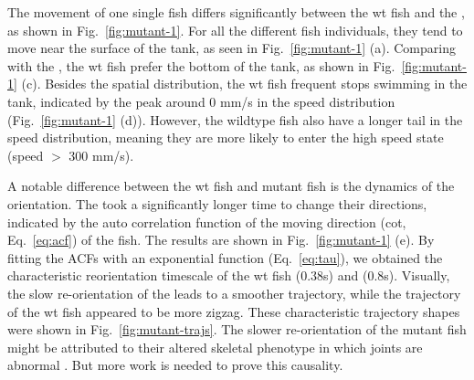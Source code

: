 \documentclass[11pt,twoside]{report}
\begin{document}
The movement of one single fish differs significantly between the wt fish and the {\mf}, as shown in Fig.~\ref{fig:mutant-1}.
For all the different fish individuals, they tend to move near the surface of the tank, as seen in Fig.~\ref{fig:mutant-1} (a).
Comparing with the {\mf}, the wt fish prefer the bottom of the tank, as shown in Fig.~\ref{fig:mutant-1} (c).
Besides the spatial distribution, the wt fish frequent stops swimming in the tank, indicated by the peak around 0 mm/s in the speed distribution (Fig.~\ref{fig:mutant-1} (d)).
However, the wildtype fish also have a longer tail in the speed distribution, meaning they are more likely to enter the high speed state (speed $>$ 300 mm/s).


A notable difference between the wt fish and mutant fish is the dynamics of the orientation.
The {\mf} took a significantly longer time to change their directions, indicated by the auto correlation function of the moving direction (\gls{cot}, Eq.~\ref{eq:acf}) of the fish.
The results are shown in Fig.~\ref{fig:mutant-1} (e).
By fitting the ACFs with an exponential function (Eq.~\ref{eq:tau}), we obtained the characteristic reorientation timescale of the wt fish (0.38s) and {\mf} (0.8s). Visually, the slow re-orientation of the {\mf} leads to a smoother trajectory, while the trajectory of the wt fish appeared to be more zigzag. These characteristic trajectory shapes were shown in Fig.~\ref{fig:mutant-trajs}. 
The slower re-orientation of the mutant fish might be attributed to their altered skeletal phenotype in which joints are abnormal \cite{lawrence2018}. But more work is needed to prove this causality.
\end{document}
